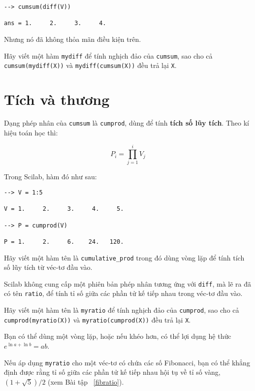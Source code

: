 \documentclass[12pt]{book}
\begin{document}
\begin{verbatim}
--> cumsum(diff(V))

ans = 1.     2.     3.     4.
\end{verbatim}
%
Nhưng nó đã không thỏa mãn điều kiện trên.

\begin{ex}
Hãy viết một hàm {\tt mydiff} để tính nghịch đảo của 
{\tt cumsum}, sao cho cả {\tt cumsum(mydiff(X))} và
{\tt mydiff(cumsum(X))} đều trả lại {\tt X}.
\end{ex}


\section{Tích và thương}

Dạng phép nhân của {\tt cumsum} là {\tt cumprod}, dùng để
tính {\bf tích số lũy tích}.  Theo kí hiệu toán học thì:

\[ P_i = \prod_{j=1}^i V_j \]

Trong Scilab, hàm đó như sau:

\begin{verbatim}
--> V = 1:5

V = 1.     2.     3.     4.     5.

--> P = cumprod(V)

P = 1.     2.     6.    24.   120.
\end{verbatim}
%
\begin{ex}
Hãy viết một hàm tên là \verb#cumulative_prod# trong đó dùng
vòng lặp để tính tích số lũy tích từ véc-tơ đầu vào.
\end{ex}

Scilab không cung cấp một phiên bản phép nhân tương ứng với
{\tt diff}, mà lẽ ra đã có tên {\tt ratio}, để tính tỉ số giữa các
phần tử kế tiếp nhau trong véc-tơ đầu vào.

\begin{ex}
Hãy viết một hàm tên là {\tt myratio} để tính nghịch đảo của
{\tt cumprod}, sao cho cả {\tt cumprod(myratio(X))} và
{\tt myratio(cumprod(X))} đều trả lại {\tt X}.

Bạn có thể dùng một vòng lặp, hoặc nếu khéo hơn, có thể lợi dụng
hệ thức $e^{\ln a + \ln b} = a b$.

Nếu áp dụng {\tt myratio} cho một véc-tơ có chứa các số Fibonacci,
bạn có thể khẳng định được rằng tỉ số giữa các phần tử kế tiếp nhau 
hội tụ về tỉ số vàng, $(1+\sqrt{5})/2$ (xem Bài tập~ \ref{fibratio}).
\end{ex}
\end{document}
